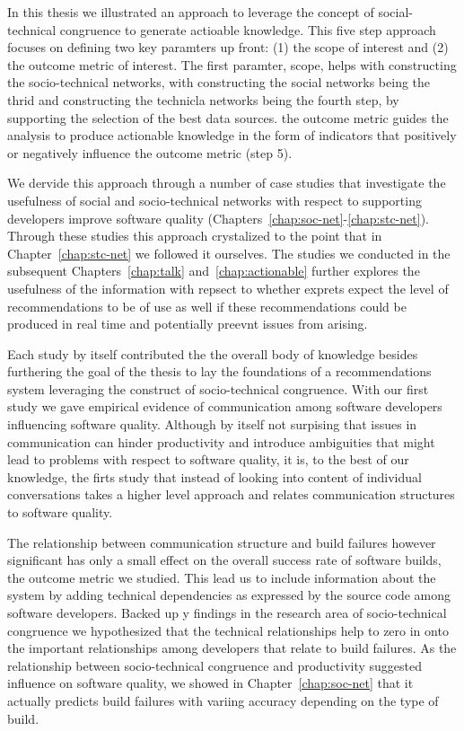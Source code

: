 In this thesis we illustrated an approach to leverage the concept of social-technical congruence to generate actioable knowledge.
This five step approach focuses on defining two key paramters up front: (1) the scope of interest and (2) the outcome metric of interest.
The first paramter, scope, helps with constructing the socio-technical networks, with constructing the social networks being the thrid and constructing the technicla networks being the fourth step, by supporting the selection of the best data sources.
the outcome metric guides the analysis to produce actionable knowledge in the form of indicators that positively or negatively influence the outcome metric (step 5). 

We dervide this approach through a number of case studies that investigate the usefulness of social and socio-technical networks with respect to supporting developers improve software quality (Chapters~\ref{chap:soc-net}-\ref{chap:stc-net}).
Through these studies this approach crystalized to the point that in Chapter~\ref{chap:stc-net} we followed it ourselves.
The studies we conducted in the subsequent Chapters~\ref{chap:talk} and~\ref{chap:actionable} further explores the usefulness of the information with repsect to whether exprets expect the level of recommendations to be of use as well if these recommendations could be produced in real time and potentially preevnt issues from arising.

Each study by itself contributed the the overall body of knowledge besides furthering the goal of the thesis to lay the foundations of a recommendations system leveraging the construct of socio-technical congruence.
With our first study we gave empirical evidence of communication among software developers influencing software quality.
Although by itself not surpising that issues in communication can hinder productivity and introduce ambiguities that might lead to problems with respect to software quality, it is, to the best of our knowledge, the firts study that instead of looking into content of individual  conversations takes a higher level approach and relates communication structures to software quality.

The relationship between communication structure and build failures however significant has only a small effect on the overall success rate of software builds, the outcome metric we studied.
This lead us to include information about the system by adding technical dependencies as expressed by the source code among software developers.
Backed up y findings in the research area of socio-technical congruence we hypothesized that the technical relationships help to zero in onto the important relationships among developers that relate to build failures.
As the relationship between socio-technical congruence and productivity suggested influence on software quality, we showed in Chapter~\ref{chap:soc-net} that it actually predicts build failures with variing accuracy depending on the type of build.

